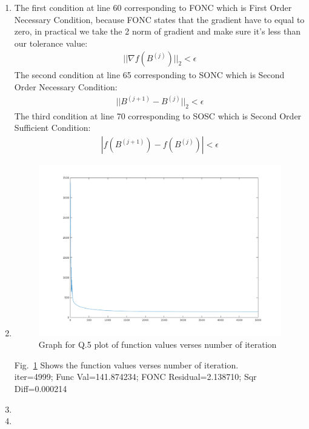 \documentclass[12pt,twoside]{article}
\begin{document}
\begin{enumerate}[1)]
\item
The first condition at line 60 corresponding to FONC which is First Order Necessary Condition, because FONC states that the gradient have to equal to zero, in practical we take the 2 norm of gradient and make sure it's less than our tolerance value:
\begin{align}
||\nabla f(B^{(j)})||_2 < \epsilon
\end{align}
The second condition at line 65 corresponding to SONC which is Second Order Necessary Condition:
\begin{align}
||B^{(j+1)} - B^{(j)}||_2 < \epsilon
\end{align}
The third condition at line 70 corresponding to SOSC which is Second Order Sufficient Condition:
\begin{align}
|f(B^{(j+1)}) - f(B^{(j)})| < \epsilon
\end{align}

\item
\begin{figure}[tb]
\centering
\includegraphics[width = 1.0\hsize]{./figures/p2q5}
\caption{Graph for Q.5 plot of function values verses number of iteration}
\label{fig:p2q5 fig}
\end{figure}
Fig.~\ref{fig:p2q5 fig} Shows the function values verses number of iteration.\\
iter=4999; Func Val=141.874234; FONC Residual=2.138710; Sqr Diff=0.000214
\item

\item

\end{enumerate}
\end{document}

